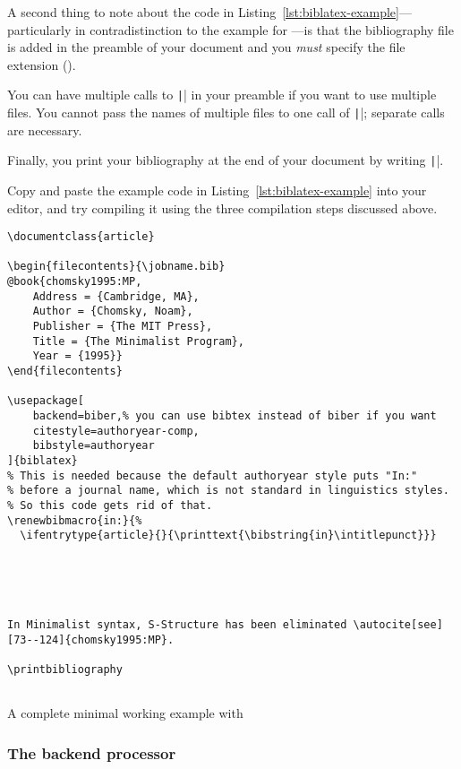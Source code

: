 A second thing to note about the code in Listing~\ref{lst:biblatex-example}---particularly in contradistinction to the example for ---is that the bibliography file is added in the preamble of your document and you \emph{must} specify the file extension ().

You can have multiple calls to \texttt|| in your preamble if you want to use multiple  files.
You cannot pass the names of multiple  files to one call of \texttt||; separate calls are necessary.

Finally, you print your bibliography at the end of your document by writing \texttt|\printbibliography|.

Copy and paste the example code in Listing~\ref{lst:biblatex-example} into your editor, and try compiling it using the three compilation steps discussed above.

\begin{listing}[htbp]
	\centering
	\begin{verbatim}
\documentclass{article}

\begin{filecontents}{\jobname.bib}
@book{chomsky1995:MP,
    Address = {Cambridge, MA},
    Author = {Chomsky, Noam},
    Publisher = {The MIT Press},
    Title = {The Minimalist Program},
    Year = {1995}}
\end{filecontents}

\usepackage[
    backend=biber,% you can use bibtex instead of biber if you want
    citestyle=authoryear-comp,
    bibstyle=authoryear
]{biblatex}
% This is needed because the default authoryear style puts "In:" 
% before a journal name, which is not standard in linguistics styles.
% So this code gets rid of that.
\renewbibmacro{in:}{%
  \ifentrytype{article}{}{\printtext{\bibstring{in}\intitlepunct}}}





In Minimalist syntax, S-Structure has been eliminated \autocite[see][73--124]{chomsky1995:MP}.

\printbibliography


	\end{verbatim}
	\caption{A complete minimal working example with }
	\label{lst:biblatex-example}
\end{listing}

\subsubsection{The backend processor}
\label{subsubsec:the-backend-processor}

